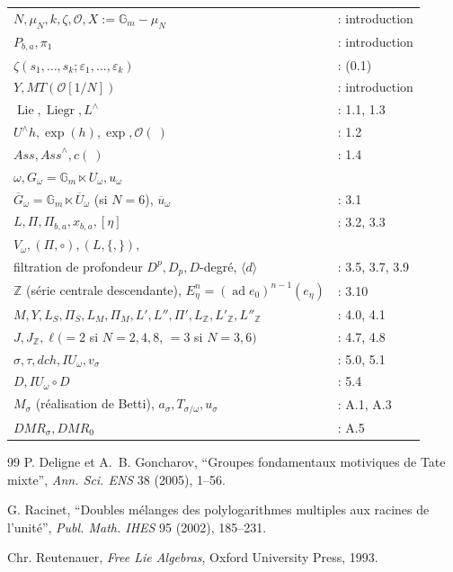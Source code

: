 \documentclass[11pt,a4paper]{article}
\theoremstyle{plain}
\theoremstyle{definition}
\DeclareMathOperator{\Lie}{Lie}
\DeclareMathOperator{\Liegr}{Liegr}
\DeclareMathOperator{\ad}{ad}
\newcommand{\Ass}{\textit{Ass}}
\newcommand{\DMR}{\mathit{DMR}}
\newcommand{\dch}{\mathit{dch}}
\newcommand{\Gm}{\mathbb{G}_m}
\newcommand{\Z}{\mathbb{Z}}
\begin{document}
\begin{tabular}{ll}
$N, \mu_N, k, \zeta, \mathcal{O}, X := \Gm - \mu_N$ & : introduction \\
$P_{b,a}, \pi_1$ & : introduction \\
$\zeta(s_1,\ldots,s_k; \varepsilon_1,\ldots,\varepsilon_k)$ & : (0.1) \\
$Y, MT(\mathcal{O}[1/N])$ & : introduction \\
$\Lie, \Liegr, L^{\wedge}$ & : 1.1, 1.3 \\
$U^{\wedge}h, \exp(h), \exp, \mathcal{O}(\ )$ & : 1.2 \\
$\Ass, \Ass^{\wedge}, c(\ )$ & : 1.4 \\
$\omega, G_\omega = \Gm \ltimes U_\omega, u_\omega$ & \\
\quad $\overline{G}_\omega = \Gm \ltimes \overline{U}_\omega$ (si $N=6$), $\overline{u}_\omega$ & : 3.1 \\
$L, \Pi, \Pi_{b,a}, x_{b,a}, [\eta]$ & : 3.2, 3.3 \\
$V_\omega, (\Pi, \circ), (L, \{,\}),$ & \\
\quad filtration de profondeur $D^p, D_p, D$-degr\'e, $\langle d \rangle$ & : 3.5, 3.7, 3.9 \\
$\Z$ (s\'erie centrale descendante), $E_\eta^n = (\ad e_0)^{n-1}(e_\eta)$ & : 3.10 \\
$M, Y, L_S, \Pi_S, L_M, \Pi_M, L', L'', \Pi', L_\Z, L'_\Z, L''_\Z$ & : 4.0, 4.1 \\
$J, J_\Z, \ell (=2$ si $N=2,4,8$, $=3$ si $N=3,6)$ & : 4.7, 4.8 \\
$\sigma, \tau, \dch, IU_\omega, v_\sigma$ & : 5.0, 5.1 \\
$D, IU_\omega \circ D$ & : 5.4 \\
$M_\sigma$ (r\'ealisation de Betti), $a_\sigma, T_{\sigma/\omega}, u_\sigma$ & : A.1, A.3 \\
$\DMR_\sigma, \DMR_0$ & : A.5
\end{tabular}

\begin{thebibliography}{99}
P. Deligne et A.~B. Goncharov, ``Groupes fondamentaux motiviques de Tate mixte'', \textit{Ann. Sci. ENS} 38 (2005), 1--56.

G. Racinet, ``Doubles m\'elanges des polylogarithmes multiples aux racines de l'unit\'e'', \textit{Publ. Math. IHES} 95 (2002), 185--231.

Chr. Reutenauer, \textit{Free Lie Algebras}, Oxford University Press, 1993.
\end{thebibliography}
\end{document}
